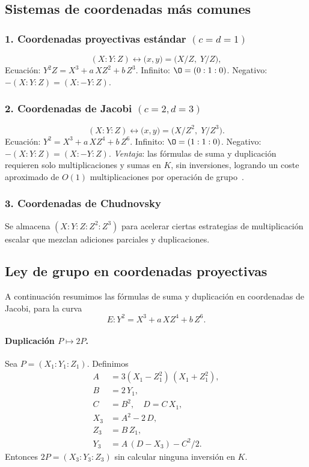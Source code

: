 \subsection{Sistemas de coordenadas más comunes}

\subsubsection*{1. Coordenadas proyectivas estándar \((c=d=1)\)}
\[
  (X:Y:Z)\leftrightarrow\bigl(x,y\bigr)=\bigl(X/Z,\;Y/Z\bigr),
\]
\- Ecuación: \(Y^2Z = X^3 + a\,XZ^2 + b\,Z^3\).  
\- Infinito: \(\O=(0:1:0)\).  
\- Negativo: \(-(X:Y:Z)=(X:-Y:Z)\).

\subsubsection*{2. Coordenadas de Jacobi \((c=2,d=3)\)}
\[
  (X:Y:Z)\leftrightarrow\bigl(x,y\bigr)=\bigl(X/Z^2,\;Y/Z^3\bigr).
\]
\- Ecuación: \(Y^2 = X^3 + a\,X Z^4 + b\,Z^6\).  
\- Infinito: \(\O=(1:1:0)\).  
\- Negativo: \(-(X:Y:Z)=(X:-Y:Z)\).  
\- \emph{Ventaja}: las fórmulas de suma y duplicación requieren solo multiplicaciones y sumas en \(K\), sin inversiones, logrando un coste aproximado de \(O(1)\) multiplicaciones por operación de grupo~\cite{SilvermanAEC}.

\subsubsection*{3. Coordenadas de Chudnovsky}
Se almacena \((X:Y:Z:Z^2:Z^3)\) para acelerar ciertas estrategias de multiplicación escalar que mezclan adiciones parciales y duplicaciones.

\subsection{Ley de grupo en coordenadas proyectivas}

A continuación resumimos las fórmulas de suma y duplicación en coordenadas de Jacobi, para la curva
\[
  E\colon Y^2 = X^3 + a\,X Z^4 + b\,Z^6.
\]

\paragraph{Duplicación \(P\mapsto2P\).} Sea \(P=(X_1:Y_1:Z_1)\). Definimos
\[
\begin{aligned}
  A &= 3(X_1 - Z_1^2)\,(X_1 + Z_1^2),\\
  B &= 2\,Y_1,\\
  C &= B^2,\quad
  D = C\,X_1,\\
  X_3 &= A^2 - 2\,D,\\
  Z_3 &= B\,Z_1,\\
  Y_3 &= A\,(D - X_3) - C^2/2.
\end{aligned}
\]
Entonces \(2P=(X_3:Y_3:Z_3)\) sin calcular ninguna inversión en \(K\).

